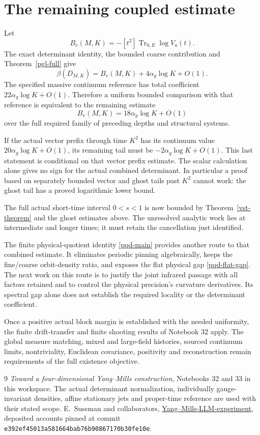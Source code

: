 \section{The remaining coupled estimate}

Let
\[
 B_v(M,K)=-[t^2]\operatorname{Tr}_{0,E}\log V_a(t).
\]
The exact determinant identity, the bounded coarse
contribution and Theorem~\ref{pgl-full} give
\[
 \beta(D_{M,K})=B_v(M,K)+4\alpha_g\log K+O(1).
\]
The specified massive continuum reference has total
coefficient \(22\alpha_g\log K+O(1)\).
Therefore a uniform bounded comparison with that
reference is equivalent to the remaining estimate
\[
                  B_v(M,K)=18\alpha_g\log K+O(1)
\]
over the full required family of preceding depths and
structural systems.

If the actual vector prefix through time \(K^2\)
has its continuum value \(20\alpha_g\log K+O(1)\),
its remaining tail must be
\(-2\alpha_g\log K+O(1)\).
This last statement is conditional on that vector
prefix estimate. The scalar calculation alone gives
no sign for the actual combined determinant.
In particular a proof based on separately bounded
vector and ghost tails past \(K^2\) cannot work:
the ghost tail has a proved logarithmic lower bound.

The full actual short-time interval \(0<s<1\) is
now bounded by Theorem~\ref{vst-theorem} and the
ghost estimates above. The unresolved analytic work
lies at intermediate and longer times; it must
retain the cancellation just identified.

The finite physical-quotient identity
\eqref{pqd-main} provides another route to that
combined estimate. It eliminates periodic pinning
algebraically, keeps the fine/coarse orbit-density
ratio, and exposes the flat physical gap
\eqref{pqd-flat-gap}. The next work on this route is
to justify the joint infrared passage with all
factors retained and to control the physical
precision's curvature derivatives. Its spectral
gap alone does not establish the required locality
or the determinant coefficient.

Once a positive actual block margin is established
with the needed uniformity, the finite drift-transfer
and finite shooting results of Notebook 32 apply.
The global measure matching, mixed and large-field
histories, sourced continuum limits, nontriviality,
Euclidean covariance, positivity and reconstruction
remain requirements of the full existence objective.

\begin{thebibliography}{9}
\emph{Toward a four-dimensional Yang--Mills construction},
Notebooks 32 and 33 in this workspace.
The actual determinant normalization, individually
gauge-invariant densities, affine stationary jets
and proper-time reference are used with their
stated scope.
E.~Sussman and collaborators,
\href{https://github.com/ethanwsussman/Yang--Mills-LLM-experiment}
{Yang--Mills-LLM-experiment}, deposited accounts pinned at
commit \texttt{e392ef45013a581664bab76b90867170b30fe10e}.
\end{thebibliography}


